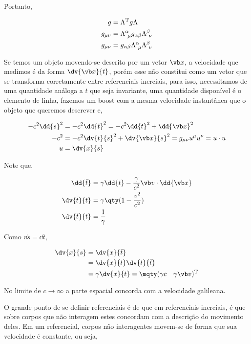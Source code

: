\documentclass[twoside]{amsart}
\numberwithin{equation}{section}
\begin{document}
\begin{refsection}
Portanto,

\begin{align}
    g&=\Lambda^{\textup T}g\Lambda\\
    g_{\mu\nu}&=\Lambda^\alpha_{\ \mu}g_{\alpha\beta}\Lambda^\beta_{\ \nu}\\
    g_{\mu\nu}&=g_{\alpha\beta}\Lambda^\alpha_{\ \mu}\Lambda^\beta_{\ \nu}
\end{align}

Se temos um objeto movendo-se descrito por um vetor $\vb x$, a velocidade que medimos é da forma $\dv{\vb x}{t}$, porém esse não constitui como um vetor que se transforma corretamente entre referenciais inerciais, para isso, necessitamos de uma quantidade análoga a $t$ que seja invariante, uma quantidade disponível é o elemento de linha, fazemos um boost com a mesma velocidade instantânea que o objeto que queremos descrever e,

\begin{align}
    -c^2\dd{s}^2&=-c^2\dd{{\bar t}}^2=-c^2\dd{t}^2+\dd{\vb x}^2\\
    -c^2&=-c^2\dv{t}{s}^2+\dv{\vb x}{s}^2=g_{\mu\nu}u^\mu u^\nu=u\cdot u\\
    u&=\dv{x}{s}
\end{align}

Note que,

\begin{align}
    \dd{{\bar t}}&=\gamma\dd{t}-\frac{\gamma}{c^2}\vb v\cdot \dd{\vb x}\\
    \dv{{\bar t}}{t}&=\gamma\qty(1-\frac{v^2}{c^2})\\
    \dv{{\bar t}}{t}&=\frac{1}{\gamma}
\end{align}

Como $\dd{s}=\dd{{\bar t}}$,

\begin{align}
    \dv{x}{s}&=\dv{x}{{\bar t}}\\
    &=\dv{x}{t}\dv{t}{{\bar t}}\\
    &=\gamma \dv{x}{t}=\mqty(\gamma c&\gamma\vb v)^{\textup T}
\end{align}

No limite de $c\rightarrow \infty$ a parte espacial concorda com a velocidade galileana.

O grande ponto de se definir referenciais é de que em referenciais inerciais, é que sobre corpos que não interagem estes concordam com a descrição do movimento deles. Em um referencial, corpos não interagentes movem-se de forma que sua velocidade é constante, ou seja,


\end{refsection}
\end{document}
